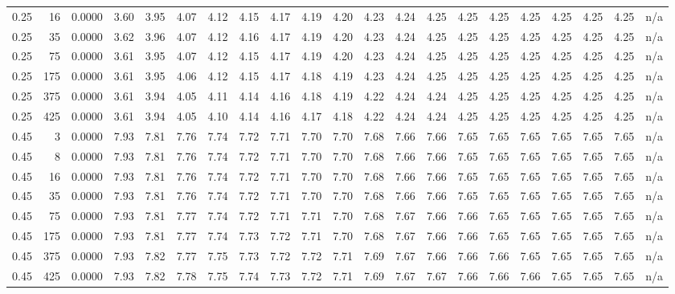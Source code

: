 \begin{table}[htbp]
{\begin{tabular}{r r r r r r r r r r r r r r r r r r r r r}
      0.25 & 16 & 0.0000 & 3.60 & 3.95 & 4.07 & 4.12 & 4.15 & 4.17 & 4.19 & 4.20 & 4.23 & 4.24 & 4.25 & 4.25 & 4.25 & 4.25 & 4.25 & 4.25 & 4.25 & n/a \\
      0.25 & 35 & 0.0000 & 3.62 & 3.96 & 4.07 & 4.12 & 4.16 & 4.17 & 4.19 & 4.20 & 4.23 & 4.24 & 4.25 & 4.25 & 4.25 & 4.25 & 4.25 & 4.25 & 4.25 & n/a \\
      0.25 & 75 & 0.0000 & 3.61 & 3.95 & 4.07 & 4.12 & 4.15 & 4.17 & 4.19 & 4.20 & 4.23 & 4.24 & 4.25 & 4.25 & 4.25 & 4.25 & 4.25 & 4.25 & 4.25 & n/a \\
      0.25 & 175 & 0.0000 & 3.61 & 3.95 & 4.06 & 4.12 & 4.15 & 4.17 & 4.18 & 4.19 & 4.23 & 4.24 & 4.25 & 4.25 & 4.25 & 4.25 & 4.25 & 4.25 & 4.25 & n/a \\
      0.25 & 375 & 0.0000 & 3.61 & 3.94 & 4.05 & 4.11 & 4.14 & 4.16 & 4.18 & 4.19 & 4.22 & 4.24 & 4.24 & 4.25 & 4.25 & 4.25 & 4.25 & 4.25 & 4.25 & n/a \\
      0.25 & 425 & 0.0000 & 3.61 & 3.94 & 4.05 & 4.10 & 4.14 & 4.16 & 4.17 & 4.18 & 4.22 & 4.24 & 4.24 & 4.25 & 4.25 & 4.25 & 4.25 & 4.25 & 4.25 & n/a \\
      0.45 & 3 & 0.0000 & 7.93 & 7.81 & 7.76 & 7.74 & 7.72 & 7.71 & 7.70 & 7.70 & 7.68 & 7.66 & 7.66 & 7.65 & 7.65 & 7.65 & 7.65 & 7.65 & 7.65 & n/a \\
      0.45 & 8 & 0.0000 & 7.93 & 7.81 & 7.76 & 7.74 & 7.72 & 7.71 & 7.70 & 7.70 & 7.68 & 7.66 & 7.66 & 7.65 & 7.65 & 7.65 & 7.65 & 7.65 & 7.65 & n/a \\
      0.45 & 16 & 0.0000 & 7.93 & 7.81 & 7.76 & 7.74 & 7.72 & 7.71 & 7.70 & 7.70 & 7.68 & 7.66 & 7.66 & 7.65 & 7.65 & 7.65 & 7.65 & 7.65 & 7.65 & n/a \\
      0.45 & 35 & 0.0000 & 7.93 & 7.81 & 7.76 & 7.74 & 7.72 & 7.71 & 7.70 & 7.70 & 7.68 & 7.66 & 7.66 & 7.65 & 7.65 & 7.65 & 7.65 & 7.65 & 7.65 & n/a \\
      0.45 & 75 & 0.0000 & 7.93 & 7.81 & 7.77 & 7.74 & 7.72 & 7.71 & 7.71 & 7.70 & 7.68 & 7.67 & 7.66 & 7.66 & 7.65 & 7.65 & 7.65 & 7.65 & 7.65 & n/a \\
      0.45 & 175 & 0.0000 & 7.93 & 7.81 & 7.77 & 7.74 & 7.73 & 7.72 & 7.71 & 7.70 & 7.68 & 7.67 & 7.66 & 7.66 & 7.65 & 7.65 & 7.65 & 7.65 & 7.65 & n/a \\
      0.45 & 375 & 0.0000 & 7.93 & 7.82 & 7.77 & 7.75 & 7.73 & 7.72 & 7.72 & 7.71 & 7.69 & 7.67 & 7.66 & 7.66 & 7.66 & 7.65 & 7.65 & 7.65 & 7.65 & n/a \\
      0.45 & 425 & 0.0000 & 7.93 & 7.82 & 7.78 & 7.75 & 7.74 & 7.73 & 7.72 & 7.71 & 7.69 & 7.67 & 7.67 & 7.66 & 7.66 & 7.66 & 7.65 & 7.65 & 7.65 & n/a \\

\end{tabular}}
\end{table}
